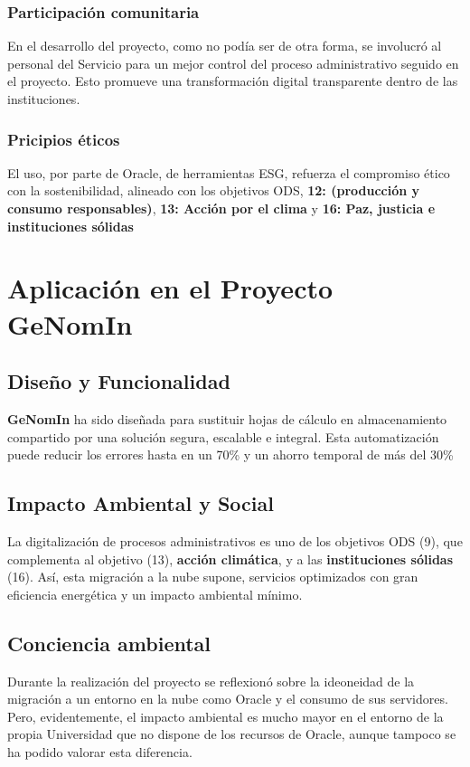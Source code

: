 \subsubsection{Participación comunitaria}
En el desarrollo del proyecto, como no podía ser de otra forma, se involucró al personal del Servicio para un mejor control del proceso administrativo seguido en el proyecto. Esto promueve una transformación digital transparente dentro de las instituciones.

\subsubsection{Pricipios éticos}
El uso, por parte de Oracle, de herramientas \acrshort{ESG}, refuerza el compromiso ético con la sostenibilidad, alineado con los objetivos \acrshort{ODS}, \textbf{12: (producción
y consumo responsables)}, \textbf{13: Acción por
el clima} y \textbf{16: Paz, justicia e instituciones sólidas}

\section{Aplicación en el Proyecto GeNomIn}
\subsection{Diseño y Funcionalidad}
\textbf{GeNomIn} ha sido diseñada para sustituir hojas de cálculo en almacenamiento compartido por una solución segura, escalable e integral. Esta automatización puede reducir los errores hasta en un 70\% y un ahorro temporal de más del 30\%
\subsection{Impacto Ambiental y Social}
La digitalización de procesos administrativos es uno de los objetivos \acrshort{ODS} (9), que complementa al objetivo (13), \textbf{acción climática}, y a las \textbf{instituciones sólidas} (16). Así, esta migración a la nube supone,  servicios optimizados con gran eficiencia energética y un impacto ambiental mínimo.
\subsection{Conciencia ambiental}
Durante la realización del proyecto se reflexionó sobre la ideoneidad de la migración a un entorno en la nube como Oracle y el consumo de sus servidores. Pero, evidentemente, el impacto ambiental es mucho mayor en el entorno de la propia Universidad que no dispone de los recursos de Oracle, aunque tampoco se ha podido valorar esta diferencia.

